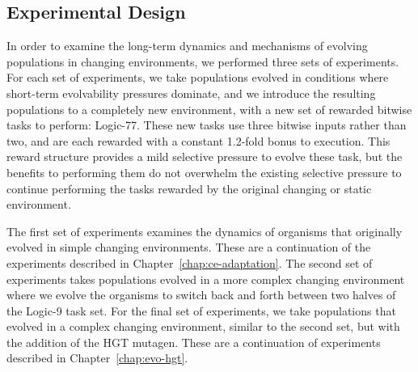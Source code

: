\documentclass[PhD]{msu-thesis}
\begin{document}
\subsection{Experimental Design}
In order to examine the long-term dynamics and mechanisms of evolving populations in changing environments, we performed three sets of experiments. For each set of experiments, we take 
populations evolved in conditions where short-term evolvability pressures dominate, and we introduce the resulting populations to a completely new environment, with a new set of rewarded bitwise tasks to perform: Logic-77. These new tasks use 
three bitwise inputs rather than 
two, and are each rewarded with a constant 1.2-fold bonus to execution. This reward structure provides a mild selective pressure to evolve these task, but the benefits to performing them do not overwhelm the existing selective pressure to continue performing the tasks rewarded by the original changing or static environment. 

The first set of experiments examines the dynamics of organisms
that originally evolved in simple changing environments. These are a continuation of the experiments described in Chapter~\ref{chap:ce-adaptation}. The second set of experiments takes populations evolved in a more complex changing environment where we evolve the organisms to switch back and forth between two halves of the Logic-9 task set.
For the final set of experiments, we take populations that evolved in a complex changing environment, similar to the second set, but with the addition of the HGT mutagen.
These are a continuation of experiments described in Chapter~\ref{chap:evo-hgt}.
\end{document}
